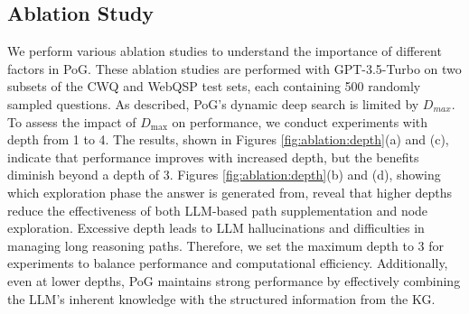 \subsection{Ablation Study}\label{exp:ablation}
We perform various ablation studies to understand the importance of different factors in PoG. 
These ablation studies are performed with GPT-3.5-Turbo on two subsets of the CWQ and WebQSP test sets, each containing 500 randomly sampled questions.
\newline
{} As described, PoG's dynamic deep search is limited by $D_{max}$. 
To assess the impact of $D_{\max}$ on performance, we conduct experiments with depth from 1 to 4. The results, shown in Figures \ref{fig:ablation:depth}(a) and (c), indicate that performance improves with increased depth, but the benefits diminish beyond a depth of 3. 
Figures \ref{fig:ablation:depth}(b) and (d), showing which exploration phase the answer is generated from, reveal that higher depths reduce the effectiveness of both LLM-based path supplementation and node exploration. 
Excessive depth leads to LLM hallucinations and difficulties in managing long reasoning paths.
Therefore, we set the maximum depth to 3 for experiments to balance performance and computational efficiency.
Additionally, even at lower depths, PoG maintains strong performance by effectively combining the LLM's inherent knowledge with the structured information from the KG.
